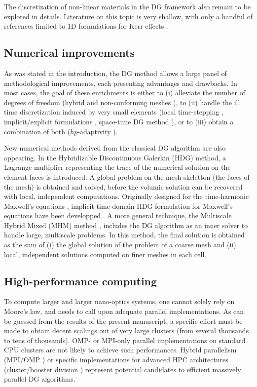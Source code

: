 The discretization of non-linear materials in the DG framework also remain to be explored in details. Literature on this topic is very shallow, with only a handful of references limited to 1D formulations for Kerr effects \cite{Blank1} \cite{Fezoui2}.

\subsection{Numerical improvements}

As was stated in the introduction, the DG method allows a large panel of methodological improvements, each presenting advantages and drawbacks. In most cases, the goal of these enrichments is either to (i) alleviate the number of degrees of freedom (hybrid \cite{Leger1} and non-conforming meshes \cite{Fahs2}), to (ii) handle the ill time discretization induced by very small elements (local time-stepping \cite{Diaz1}, implicit/explicit formulations \cite{Moya1}, space-time DG method \cite{Petersen1}), or to (iii) obtain a combination of both ($hp$-adaptivity \cite{Schnepp1}).

New numerical methods derived from the classical DG algorithm are also appearing. In the Hybridizable Discontinuous Galerkin (HDG) method, a Lagrange multiplier representing the trace of the numerical solution on the element faces is introduced. A global problem on the mesh skeletton (\ie the faces of the mesh) is obtained and solved, before the volumic solution can be recovered with local, independent computations. Originally designed for the time-harmonic Maxwell's equations \cite{Nguyen1}, implicit time-domain HDG formulation for Maxwell's equations have been developped \cite{Lanteri4}. A more general technique, the Multiscale Hybrid Mixed (MHM) method \cite{Harder1}, includes the DG algorithm as an inner solver to handle large, multiscale problems. In this method, the final solution is obtained as the sum of (i) the global solution of the problem of a coarse mesh and (ii) local, independent solutions computed on finer meshes in each cell.

\subsection{High-performance computing}

To compute larger and larger nano-optics systems, one cannot solely rely on Moore's law, and needs to call upon adequate parallel implementations. As can be guessed from the results of the present manuscript, a specific effort must be made to obtain decent scalings out of very large clusters (\ie from several thousands to tens of thousands). OMP- or MPI-only parallel implementations on standard CPU clusters are not likely to achieve such performances. Hybrid parallelism (MPI/OMP \cite{Lanteri3}) or specific implementations for advanced HPC architectures (cluster/booster division \cite{Leger2}) represent potential candidates to efficient massively parallel DG algorithms.
